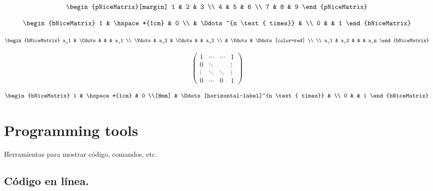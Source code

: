 	\[
	\begin{pNiceMatrix}[margin]
		1 & 2 & 3 \\
		4 & 5 & 6 \\
		7 & 8 & 9
	\end{pNiceMatrix}
	\]
	
\[
\begin{bNiceMatrix}
	1 & \hspace*{1cm} & 0 \\
	& \Ddots^{n \text{ times}} & \\
	0 & & 1
\end{bNiceMatrix}
\]

\[
\begin{bNiceMatrix}
	a_1 & \Cdots & & & a_1 \\
	\Vdots & a_2 & \Cdots & & a_2 \\
	& \Vdots & \Ddots[color=red] \\
	\\
	a_1 & a_2 & & & a_n
\end{bNiceMatrix}
\]

\[
\begin{pmatrix}
	1 & \cdots & \cdots & 1 \\
	0 & \ddots & & \vdots \\
	\vdots & \ddots & \ddots & \vdots \\
	0 & \cdots & 0 & 1
\end{pmatrix}
\]

\[
\begin{bNiceMatrix}
	1 & \hspace*{1cm} & 0 \\[8mm]
	& \Ddots[horizontal-label]^{n \text{ times}} & \\
	0 & & 1
\end{bNiceMatrix}
\]


\chapter{Programming tools}

Herramientas para mostrar código, comandos, etc.

\section{Código en línea.}

